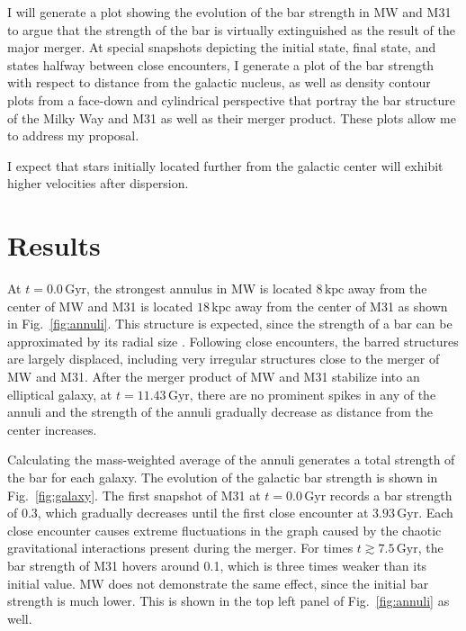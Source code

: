 \documentclass[twocolumn]{aastex631}
\DeclareRobustCommand{\Figref}[1]{Fig.~\ref{#1}}
\begin{document}
I will generate a plot showing the evolution of the bar strength in MW
and M31 to argue that the strength of the bar is virtually
extinguished as the result of the major merger. At special snapshots
depicting the initial state, final state, and states halfway between
close encounters, I generate a plot of the bar strength with respect
to distance from the galactic nucleus, as well as density contour
plots from a face-down and cylindrical perspective that portray the
bar structure of the Milky Way and M31 as well as their merger
product. These plots allow me to address my proposal.

I expect that stars initially located further from the galactic center
will exhibit higher velocities after dispersion.

\section{Results}

At $t=0.0\,\mathrm{Gyr}$, the strongest annulus in MW is located
$8\,\mathrm{kpc}$ away from the center of MW and M31 is located
$18 \,\mathrm{kpc}$ away from the center of M31 as shown in
\Figref{fig:annuli}. This structure is expected, since the strength of
a bar can be approximated by its radial size
\citep{rathore:25}. Following close encounters, the barred structures
are largely displaced, including very irregular structures close to
the merger of MW and M31. After the merger product of MW and M31
stabilize into an elliptical galaxy, at $t=11.43\,\mathrm{Gyr}$, there are
no prominent spikes in any of the annuli and the strength of the
annuli gradually decrease as distance from the center increases.

Calculating the mass-weighted average of the annuli generates a total
strength of the bar for each galaxy. The evolution of the galactic bar
strength is shown in \Figref{fig:galaxy}. The first snapshot of M31 at
$t=0.0\,\mathrm{Gyr}$ records a bar strength of 0.3, which gradually
decreases until the first close encounter at
$3.93\,\mathrm{Gyr}$. Each close encounter causes extreme fluctuations
in the graph caused by the chaotic gravitational interactions present
during the merger. For times $t \gtrsim 7.5\,\mathrm{Gyr}$, the bar
strength of M31 hovers around 0.1, which is three times weaker than
its initial value. MW does not demonstrate the same effect, since the
initial bar strength is much lower. This is shown in the top left
panel of \Figref{fig:annuli} as well.
\end{document}
